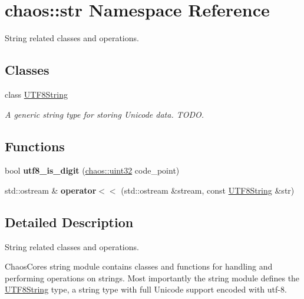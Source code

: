 \hypertarget{namespacechaos_1_1str}{}\section{chaos\+:\+:str Namespace Reference}
\label{namespacechaos_1_1str}


String related classes and operations.  


\subsection*{Classes}
\begin{DoxyCompactItemize}
\item 
class \hyperlink{classchaos_1_1str_1_1_u_t_f8_string}{U\+T\+F8\+String}
\begin{DoxyCompactList}\small\item\em A generic string type for storing Unicode data. T\+O\+D\+O. \end{DoxyCompactList}\end{DoxyCompactItemize}
\subsection*{Functions}
\begin{DoxyCompactItemize}
\item 
\hypertarget{namespacechaos_1_1str_adc9b55515e06b320356d219cb573b20e}{}bool {\bfseries utf8\+\_\+is\+\_\+digit} (\hyperlink{namespacechaos_a3b3a47ba1e284655bf1a30c441121c60}{chaos\+::uint32} code\+\_\+point)\label{namespacechaos_1_1str_adc9b55515e06b320356d219cb573b20e}

\item 
\hypertarget{namespacechaos_1_1str_af8ed01c19bc2b322f36a751694e2dd0c}{}std\+::ostream \& {\bfseries operator$<$$<$} (std\+::ostream \&stream, const \hyperlink{classchaos_1_1str_1_1_u_t_f8_string}{U\+T\+F8\+String} \&str)\label{namespacechaos_1_1str_af8ed01c19bc2b322f36a751694e2dd0c}

\end{DoxyCompactItemize}


\subsection{Detailed Description}
String related classes and operations. 

Chaos\+Core\textquotesingle{}s string module contains classes and functions for handling and performing operations on strings. Most importantly the string module defines the \hyperlink{classchaos_1_1str_1_1_u_t_f8_string}{U\+T\+F8\+String} type, a string type with full Unicode support encoded with utf-\/8. 